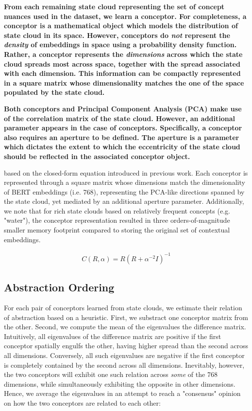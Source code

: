 \textbf{From each remaining state cloud representing the set of concept nuances used in the dataset, we learn a conceptor. For completeness, a conceptor is a mathematical object which models the distribution of state cloud in its space. However, conceptors do \textit{not} represent the \textit{density} of embeddings in space using a probability density function. Rather, a conceptor represents the \textit{dimensions} across which the state cloud spreads most across space, together with the spread associated with each dimension. This information can be compactly represented in a square matrix whose dimensionality matches the one of the space populated by the state cloud.}

\textbf{Both conceptors and Principal Component Analysis (PCA) make use of the correlation matrix of the state cloud. However, an additional parameter appears in the case of conceptors. Specifically, a conceptor also requires an aperture to be defined. The aperture is a parameter which dictates the extent to which the eccentricity of the state cloud should be reflected in the associated conceptor object.}

based on the closed-form equation introduced in previous work. Each conceptor is represented through a square matrix whose dimensions match the dimensionality of BERT embeddings (i.e. 768), representing the PCA-like directions spanned by the state cloud, yet mediated by an additional aperture parameter. Additionally, we note that for rich state clouds based on relatively frequent concepts (e.g. "water"), the conceptor representation resulted in three orders-of-magnitude smaller memory footprint compared to storing the original set of contextual embeddings.

\begin{align*}
    C(R, \alpha) = R (R + \alpha^{-2} I)^{-1}
\end{align*}

\subsection{Abstraction Ordering}

For each pair of conceptors learned from state clouds, we estimate their relation of abstraction based on a heuristic. First, we substract one conceptor matrix from the other. Second, we compute the mean of the eigenvalues the difference matrix. Intuitively, all eigenvalues of the difference matrix are positive if the first conceptor spatially engulfs the other, having higher spread than the second across all dimensions. Conversely, all such eigenvalues are negative if the first conceptor is completely contained by the second across all dimensions. Inevitably, however, the two conceptors will exhibit one such relation across \textit{some} of the 768 dimensions, while simultaneously exhibiting the opposite in other dimensions. Hence, we average the eigenvalues in an attempt to reach a "consensus" opinion on how the two conceptors are related to each other:

